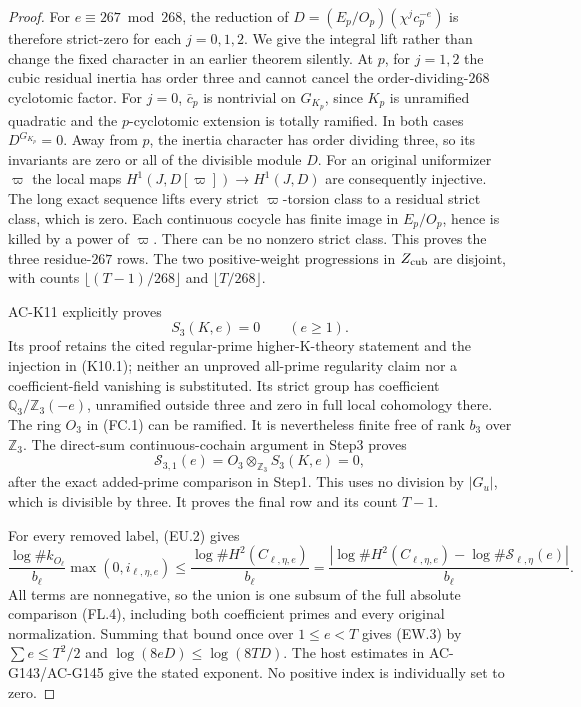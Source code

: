 \begin{proof}
For $e\equiv267\bmod268$, the reduction of
$D=(E_p/O_p)(\chi^j c_p^{-e})$ is therefore strict-zero for
each $j=0,1,2$.
We give the integral lift rather than change the fixed character
in an earlier theorem silently.
At $p$, for $j=1,2$ the cubic residual inertia has order three
and cannot cancel the order-dividing-$268$ cyclotomic factor.
For $j=0$, $\bar c_p$ is nontrivial on $G_{K_p}$, since $K_p$
is unramified quadratic and the $p$-cyclotomic extension is
totally ramified.  In both cases $D^{G_{K_p}}=0$.
Away from $p$, the inertia character has order dividing three,
so its invariants are zero or all of the divisible module $D$.
For an original uniformizer $\varpi$ the local maps
$H^1(J,D[\varpi])\to H^1(J,D)$ are consequently injective.
The long exact sequence lifts every strict $\varpi$-torsion class
to a residual strict class, which is zero.
Each continuous cocycle has finite image in $E_p/O_p$, hence is
killed by a power of $\varpi$.
There can be no nonzero strict class.
This proves the three residue-$267$ rows.
The two positive-weight progressions in $Z_{\rm cub}$ are disjoint,
with counts $\lfloor(T-1)/268\rfloor$ and $\lfloor T/268\rfloor$.

AC-K11 explicitly proves
\[
                         S_3(K,e)=0\qquad(e\geq1).
 \tag{EW.8}
\]
Its proof retains the cited regular-prime higher-K-theory statement
and the injection in (K10.1); neither an unproved all-prime
regularity claim nor a coefficient-field vanishing is substituted.
Its strict group has coefficient $\mathbb Q_3/\mathbb Z_3(-e)$,
unramified outside three and zero in full local cohomology there.
The ring $O_3$ in (FC.1) can be ramified.
It is nevertheless finite free of rank $b_3$ over $\mathbb Z_3$.
The direct-sum continuous-cochain argument in Step3 proves
\[
 \mathcal S_{3,1}(e)
       =O_3\otimes_{\mathbb Z_3}S_3(K,e)=0 ,
 \tag{EW.9}
\]
after the exact added-prime comparison in Step1.
This uses no division by $|G_u|$, which is divisible by three.
It proves the final row and its count $T-1$.

For every removed label, (EU.2) gives
\[
 \frac{\log\#k_{O_\ell}}{b_\ell}\max(0,i_{\ell,\eta,e})
 \leq\frac{\log\#H^2(C_{\ell,\eta,e})}{b_\ell}
 =\frac{\left|\log\#H^2(C_{\ell,\eta,e})
                  -\log\#\mathcal S_{\ell,\eta}(e)\right|}{b_\ell}.
 \tag{EW.10}
\]
All terms are nonnegative, so the union is one subsum of the
full absolute comparison (FL.4), including both coefficient
primes and every original normalization.
Summing that bound once over $1\leq e<T$ gives (EW.3) by
$\sum e\leq T^2/2$ and $\log(8eD)\leq\log(8TD)$.
The host estimates in AC-G143/AC-G145 give the stated exponent.
No positive index is individually set to zero.


\end{proof}
